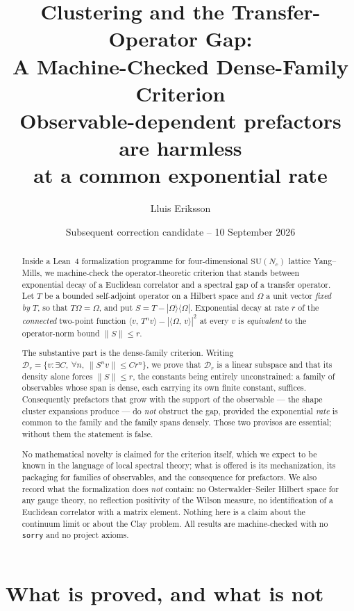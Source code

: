 \documentclass[11pt]{article}
\title{Clustering and the Transfer-Operator Gap:\\
A Machine-Checked Dense-Family Criterion\\
\large Observable-dependent prefactors are harmless\\
at a common exponential rate}
\author{Lluis Eriksson}
\date{Subsequent correction candidate -- 10 September 2026}
\theoremstyle{definition}
\newcommand{\lean}[1]{\texttt{#1}}
\newcommand{\SU}{\mathrm{SU}}
\newcommand{\Om}{\Omega}
\newcommand{\inn}[2]{\langle #1,\, #2\rangle}
\newcommand{\ket}[1]{|#1\rangle}
\newcommand{\bra}[1]{\langle #1|}
\begin{document}
\maketitle

\begin{abstract}
Inside a Lean~4 formalization programme for four-dimensional $\SU(N_c)$
lattice Yang--Mills, we machine-check the operator-theoretic criterion
that stands between exponential decay of a Euclidean correlator and a
spectral gap of a transfer operator.  Let $T$ be a bounded self-adjoint
operator on a Hilbert space and $\Om$ a unit vector \emph{fixed by} $T$,
so that $T\Om = \Om$, and put $S = T - \ket{\Om}\bra{\Om}$.  Exponential
decay at rate $r$ of the \emph{connected} two-point function
$\inn{v}{T^n v} - |\inn{\Om}{v}|^2$ at every $v$ is \emph{equivalent} to
the operator-norm bound $\|S\| \le r$.

The substantive part is the dense-family criterion.  Writing
$\mathcal{D}_r = \{v : \exists C,\ \forall n,\ \|S^n v\| \le C r^n\}$, we
prove that $\mathcal{D}_r$ is a linear subspace and that its density
alone forces $\|S\| \le r$, the constants being entirely unconstrained:
a family of observables whose span is dense, each carrying its own finite
constant, suffices.  Consequently prefactors that grow with the support
of the observable --- the shape cluster expansions produce --- do
\emph{not} obstruct the gap, provided the exponential \emph{rate} is
common to the family and the family spans densely.  Those two provisos
are essential; without them the statement is false.

No mathematical novelty is claimed for the criterion itself, which we
expect to be known in the language of local spectral theory; what is
offered is its mechanization, its packaging for families of observables,
and the consequence for prefactors.  We also record what the
formalization does \emph{not} contain: no Osterwalder--Seiler Hilbert
space for any gauge theory, no reflection positivity of the Wilson
measure, no identification of a Euclidean correlator with a matrix
element.  Nothing here is a claim about the continuum limit or about the
Clay problem.  All results are machine-checked with no \lean{sorry} and
no project axioms.
\end{abstract}

\section{What is proved, and what is not}
\end{document}
